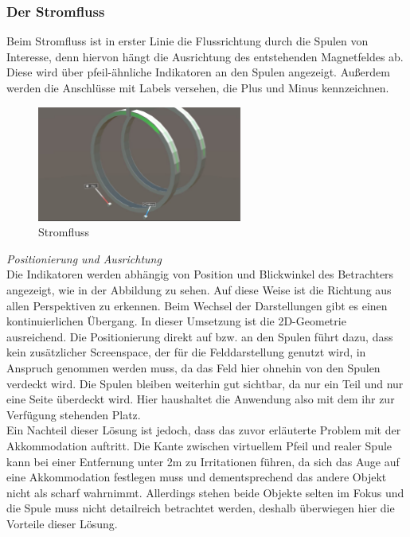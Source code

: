 \subsubsection{Der Stromfluss} 
\label{sec-4-2-3}
Beim Stromfluss ist in erster Linie die Flussrichtung durch die Spulen von Interesse, denn hiervon hängt die Ausrichtung des entstehenden Magnetfeldes ab. Diese wird über pfeil-ähnliche Indikatoren an den Spulen angezeigt. Außerdem werden die Anschlüsse mit Labels versehen, die Plus und Minus kennzeichnen.

\begin{figure}[H]
	\centering
	\includegraphics[width=0.6\textwidth]{images/current.jpg}
	\caption{Stromfluss}
	\label{img:current}
\end{figure}


\textit{Positionierung und Ausrichtung}\\
Die Indikatoren werden abhängig von Position und Blickwinkel des Betrachters angezeigt, wie in der Abbildung zu sehen. Auf diese Weise ist die Richtung aus allen Perspektiven zu erkennen. Beim Wechsel der Darstellungen gibt es einen kontinuierlichen Übergang. In dieser Umsetzung ist die 2D-Geometrie ausreichend. Die Positionierung direkt auf bzw. an den Spulen führt dazu, dass kein zusätzlicher Screenspace, der für die Felddarstellung genutzt wird, in Anspruch genommen werden muss, da das Feld hier ohnehin von den Spulen verdeckt wird. Die Spulen bleiben weiterhin gut sichtbar, da nur ein Teil und nur eine Seite überdeckt wird. Hier haushaltet die Anwendung also mit dem ihr zur Verfügung stehenden Platz.\\

Ein Nachteil dieser Lösung ist jedoch, dass das zuvor erläuterte Problem mit der Akkommodation auftritt. Die Kante zwischen virtuellem Pfeil und realer Spule kann bei einer Entfernung unter 2m zu Irritationen führen, da sich das Auge auf eine Akkommodation festlegen muss und dementsprechend das andere Objekt nicht als scharf wahrnimmt. Allerdings stehen beide Objekte selten im Fokus und die Spule muss nicht detailreich betrachtet werden, deshalb überwiegen hier die Vorteile dieser Lösung.\\

